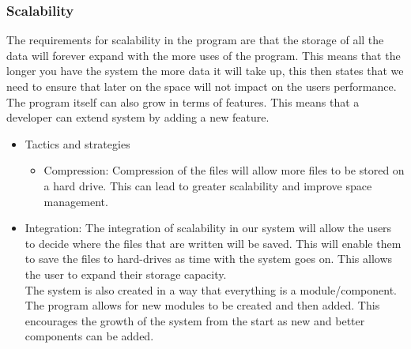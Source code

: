 
%

\subsubsection{Scalability}
\begin{flushleft}
The requirements for scalability in the program are that the storage of all the data will forever expand with the more uses of the program. This means that the longer you have the system the more data it will take up, this then states that we need to ensure that later on the space will not impact on the users performance. The program itself can also grow in terms of features. This means that a developer can extend system by adding a new feature.
\begin{itemize}
\item{Tactics and strategies}
\begin{itemize}
\item{Compression}: Compression of the files will allow more files to be stored on a hard drive. This can lead to greater scalability and improve space management.
\end{itemize}

\item{Integration}: The integration of scalability in our system will allow the users to decide where the files that are written will be saved. This will enable them to save the files to hard-drives as time with the system goes on. This allows the user to expand their storage capacity. \\
The system is also created in a way that everything is a module/component. The program allows for new modules to be created and then added. This encourages the growth of the system from the start as new and better components can be added.
\end{itemize}

\end{flushleft}
		
